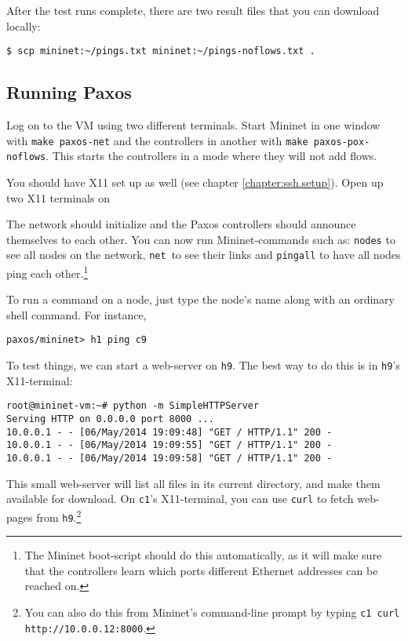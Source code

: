 After the test runs complete, there are two result files that you can
download locally:

\begin{Verbatim}
$ scp mininet:~/pings.txt mininet:~/pings-noflows.txt .
\end{Verbatim}

\subsection{Running Paxos}
\label{chapter:running.paxos}

Log on to the VM using two different terminals.  Start Mininet in one
window with \texttt{make paxos-net} and the controllers in another
with \texttt{make paxos-pox-noflows}.  This starts the controllers in a mode
where they will not add flows.

You should have X11 set up as well (see
chapter \ref{chapter:ssh.setup}).  Open up two X11 terminals on

The network should initialize and the Paxos controllers should announce
themselves to each other.  You can now run
Mininet-commands such as: \texttt{nodes} to see all
nodes on the network, \texttt{net} to see their links and \texttt{pingall}
 to have all nodes ping each other.\footnote{The 
Mininet boot-script should do this automatically, as it will make sure that
the controllers learn which ports different Ethernet addresses can be
reached on.}

To run a command on a node, just type the node's name along with an ordinary
shell command.  For instance,

\begin{Verbatim}
paxos/mininet> h1 ping c9
\end{Verbatim}

To test things, we can start a web-server on
\texttt{h9}. The best way to do this is in \texttt{h9}'s X11-terminal:

\begin{Verbatim}
root@mininet-vm:~# python -m SimpleHTTPServer
Serving HTTP on 0.0.0.0 port 8000 ...
10.0.0.1 - - [06/May/2014 19:09:48] "GET / HTTP/1.1" 200 -
10.0.0.1 - - [06/May/2014 19:09:55] "GET / HTTP/1.1" 200 -
10.0.0.1 - - [06/May/2014 19:09:58] "GET / HTTP/1.1" 200 -
\end{Verbatim}

This small web-server will list all files in its current directory, and make
them available for download.
On \texttt{c1}'s X11-terminal, you can use \texttt{curl} to fetch
web-pages from \texttt{h9}.\footnote{You can also do this from Mininet's
command-line prompt by typing \texttt{c1 curl http://10.0.0.12:8000}.}

